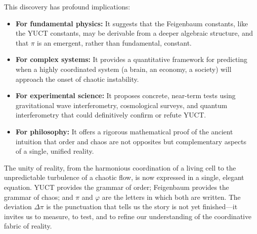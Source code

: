 \documentclass[12pt,a4paper]{article}
\begin{document}
{	This discovery has profound implications:
	\begin{itemize}
		\item \textbf{For fundamental physics:} It suggests that the Feigenbaum constants, like the YUCT constants, may be derivable from a deeper algebraic structure, and that \(\pi\) is an emergent, rather than fundamental, constant.
		\item \textbf{For complex systems:} It provides a quantitative framework for predicting when a highly coordinated system (a brain, an economy, a society) will approach the onset of chaotic instability.
		\item \textbf{For experimental science:} It proposes concrete, near-term tests using gravitational wave interferometry, cosmological surveys, and quantum interferometry that could definitively confirm or refute YUCT.
		\item \textbf{For philosophy:} It offers a rigorous mathematical proof of the ancient intuition that order and chaos are not opposites but complementary aspects of a single, unified reality.
	\end{itemize}
	
	The unity of reality, from the harmonious coordination of a living cell to the unpredictable turbulence of a chaotic flow, is now expressed in a single, elegant equation. YUCT provides the grammar of order; Feigenbaum provides the grammar of chaos; and \(\pi\) and \(\varphi\) are the letters in which both are written. The deviation \(\Delta\pi\) is the punctuation that tells us the story is not yet finished—it invites us to measure, to test, and to refine our understanding of the coordinative fabric of reality.
	
}
\end{document}

